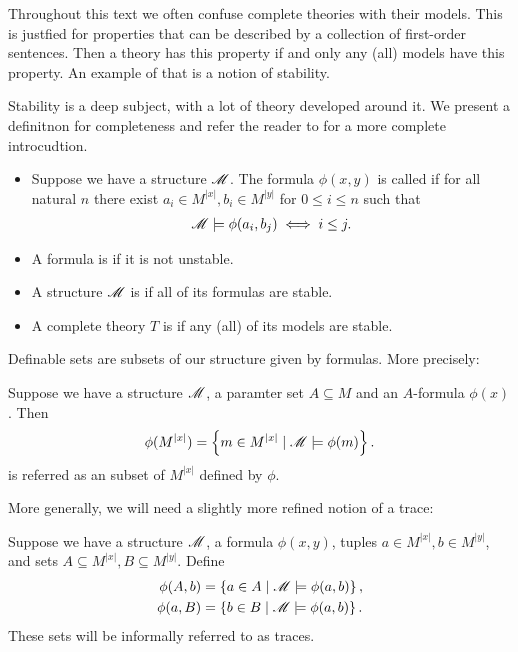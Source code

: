 Throughout this text we often confuse complete theories with their models.
This is justfied for properties that can be described by a collection of first-order sentences.
Then a theory has this property if and only any (all) models have this property.
An example of that is a notion of stability.

Stability is a deep subject, with a lot of theory developed around it.
We present a definitnon for completeness and refer the reader to \noref for a more complete introcudtion.

\begin{Definition}
  \begin{itemize}
  \item Suppose we have a structure $\mathscr M$.
    The formula $\phi(x,y)$ is called  if for all natural $n$
    there exist $a_i \in M^{|x|}, b_i \in M^{|y|}$ for $0 \leq i \leq n$ such that
    \begin{align*}
      \mathscr M \models \phi(a_i, b_j) \iff i \leq j.
    \end{align*}
  \item A formula is  if it is not unstable.
  \item A structure $\mathscr M$ is  if all of its formulas are stable.
  \item A complete theory $T$ is  if any (all) of its models are stable.
  \end{itemize}
\end{Definition}

Definable sets are subsets of our structure given by formulas.
More precisely:
\begin{Definition}
  Suppose we have a structure $\mathscr M$, a paramter set $A \subseteq M$ and an $A$-formula $\phi(x)$.
  Then
  \begin{align*}
    \phi(M^{|x|}) = \left\{m \in M^{|x|} \mid \mathscr M \models \phi(m)\right\}.
  \end{align*}
  is referred as an  subset of $M^{|x|}$ defined by $\phi$.
\end{Definition}

More generally, we will need a slightly more refined notion of a trace:
\begin{Definition}
  Suppose we have a structure $\mathscr M$, a formula $\phi(x, y)$, tuples $a \in M^{|x|}, b \in M^{|y|}$, and
  sets $A \subseteq M^{|x|}, B \subseteq M^{|y|}$. 
  Define
  \begin{align*}
    \phi(A, b) &= \left\{a \in A \mid \mathscr M \models \phi(a,b)\right\}, \\
    \phi(a, B) &= \left\{b \in B \mid \mathscr M \models \phi(a,b)\right\}.
  \end{align*}
  These sets will be informally referred to as traces.
\end{Definition}

